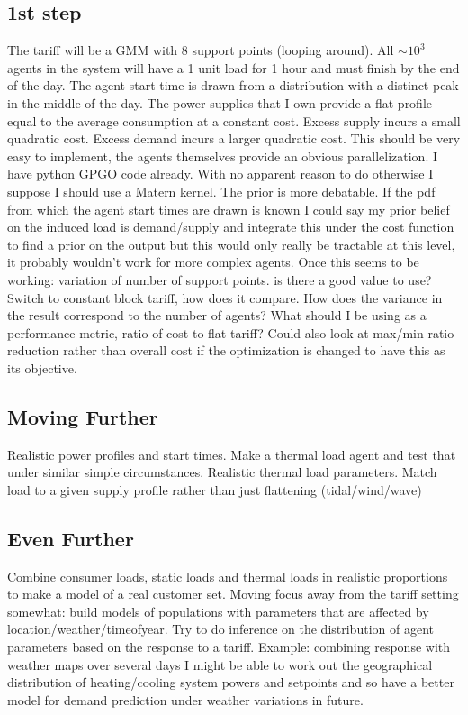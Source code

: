 \documentclass[11pt]{article}
\begin{document}
\subsection{1st step}
The tariff will be a GMM with 8 support points (looping around). All $\sim 10^{3}$
agents in the system will have a 1 unit load for 1 hour and must finish by
the end of the day. The agent start time is drawn from a distribution with a
distinct peak in the middle of the day. The power supplies that I own provide a
flat profile equal to the average consumption at a constant cost. Excess supply
incurs a small quadratic cost. Excess demand incurs a larger quadratic cost.
This should be very easy to implement, the agents themselves provide an
obvious parallelization. I have python GPGO code already. With no apparent
reason to do otherwise I suppose I should use a Matern kernel. The prior is
more debatable. If the pdf from which the agent start times are drawn is known
I could say my prior belief on the induced load is demand/supply and integrate
this under the cost function to find a prior on the output but this would only
really be tractable at this level, it probably wouldn't work for more complex
agents.
Once this seems to be working: variation of number of support points. is
there a good value to use? Switch to constant block tariff, how does it compare.
How does the variance in the result correspond to the number of agents? What
should I be using as a performance metric, ratio of cost to flat tariff? Could also
look at max/min ratio reduction rather than overall cost if the optimization is
changed to have this as its objective.

\subsection{Moving Further}
Realistic power profiles and start times. Make a thermal load agent and test that
under similar simple circumstances. Realistic thermal load parameters. Match
load to a given supply profile rather than just flattening (tidal/wind/wave)
\subsection{Even Further}
Combine consumer loads, static loads and thermal loads in realistic proportions
to make a model of a real customer set.
Moving focus away from the tariff setting somewhat: build models of populations with parameters that are affected by location/weather/timeofyear. Try
to do inference on the distribution of agent parameters based on the response
to a tariff. Example: combining response with weather maps over several days
I might be able to work out the geographical distribution of heating/cooling
system powers and setpoints and so have a better model for demand prediction
under weather variations in future.
\end{document}
